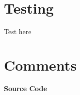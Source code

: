 \documentclass{article}
\begin{document}
\begin{normalsize}
\vskip 0.25in
\section*{Testing}
Test here


\vskip 0.25in
\section*{Comments}



\end{normalsize}
\begin{normalsize} %
\pagebreak
\pagecolor{bgcolor}
\begin{center}
\LARGE\color{gvbgdark}\textbf{Source Code}
\end{center}
\vskip 0.25in
\ttfamily
\footnotesize


\inputminted[linenos]{C}{example.c}
\end{normalsize}
\end{document}
